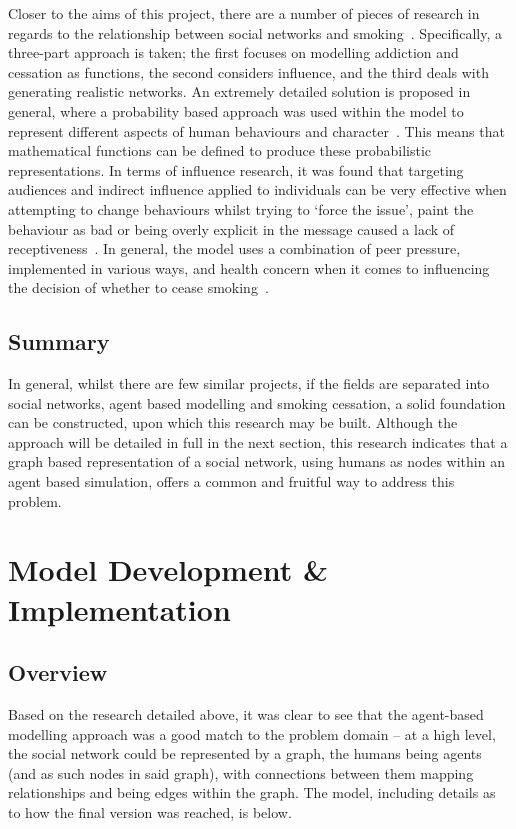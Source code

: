 \documentclass[]{report}
\begin{document}
Closer to the aims of this project, there are a number of pieces of research in regards to the relationship between social networks and smoking~\cite{SmokOmni}. Specifically, a three-part approach is taken; the first focuses on modelling addiction and cessation as functions, the second considers influence, and the third deals with generating realistic networks. An extremely detailed solution is proposed in general, where a probability based approach was used within the model to represent different aspects of human behaviours and character~\cite{SmokOmni-pap1}. This means that mathematical functions can be defined to produce these probabilistic representations. In terms of influence research, it was found that targeting audiences and indirect influence applied to individuals can be very effective when attempting to change behaviours whilst trying to `force the issue', paint the behaviour as bad or being overly explicit in the message caused a lack of receptiveness~\cite{SmokOmni-pap2}. In general, the model uses a combination of peer pressure, implemented in various ways, and health concern when it comes to influencing the decision of whether to cease smoking~\cite{SmokOmni-pap3}.

\section{Summary}
In general, whilst there are few similar projects, if the fields are separated into social networks, agent based modelling and smoking cessation, a solid foundation can be constructed, upon which this research may be built. Although the approach will be detailed in full in the next section, this research indicates that a graph based representation of a social network, using humans as nodes within an agent based simulation, offers a common and fruitful way to address this problem.

%
%

%
%
\chapter{Model Development \& Implementation}
\label{sec:dev}
\section{Overview}
Based on the research detailed above, it was clear to see that the agent-based modelling approach was a good match to the problem domain – at a high level, the social network could be represented by a graph, the humans being agents (and as such nodes in said graph), with connections between them mapping relationships and being edges within the graph. The model, including details as to how the final version was reached, is below.
\end{document}

